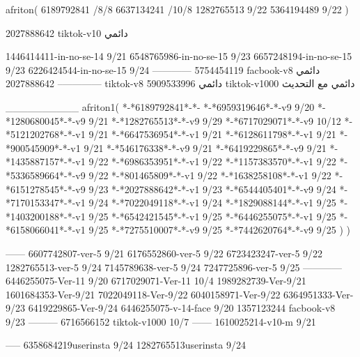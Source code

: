 afriton(
6189792841 /8/8
6637134241 /10/8
1282765513 9/22
5364194489 9/22
)

2027888642 tiktok-v10
دائمي



1446414411-in-no-se-14 9/21
6548765986-in-no-se-15 9/23
6657248194-in-no-se-15 9/23
6226424544-in-no-se-15 9/24
------------
5754454119 facbook-v8
دائمي
--------------
2027888642 tiktok-v8
دائمي
5909533996 tiktok-v1000
دائمي مع التحديث

__________
afriton1(
*-*6189792841*-*-
*-*6959319646*-*-v9 9/20
*-*1280680045*-*-v9 9/21
*-*1282765513*-*-v9 9/29
*-*6717029071*-*-v9 10/12
*-*5121202768*-*-v1 9/21
*-*6647536954*-*-v1 9/21
*-*6128611798*-*-v1 9/21
*-*900545909*-*-v1 9/21
*-*546176338*-*-v9 9/21
*-*6419229865*-*-v9 9/21
*-*1435887157*-*-v1 9/22
*-*6986353951*-*-v1 9/22
*-*1157383570*-*-v1 9/22
*-*5336589664*-*-v9 9/22
*-*801465809*-*-v1 9/22
*-*1638258108*-*-v1 9/22
*-*6151278545*-*-v9 9/23
*-*2027888642*-*-v1 9/23
*-*6544405401*-*-v9 9/24
*-*7170153347*-*-v1 9/24
*-*7022049118*-*-v1 9/24
*-*1829088144*-*-v1 9/25
*-*1403200188*-*-v1 9/25
*-*6542421545*-*-v1 9/25
*-*6446255075*-*-v1 9/25
*-*6158066041*-*-v1 9/25
*-*7275510007*-*-v9 9/25
*-*7442620764*-*-v9 9/25
)
)

------
6607742807-ver-5 9/21
6176552860-ver-5 9/22
6723423247-ver-5 9/22
1282765513-ver-5 9/24
7145789638-ver-5 9/24
7247725896-ver-5 9/25
------------
6446255075-Ver-11
9/20
6717029071-Ver-11
10/4
1989282739-Ver-9/21
1601684353-Ver-9/21
7022049118-Ver-9/22
6040158971-Ver-9/22
6364951333-Ver-9/23
6419229865-Ver-9/24
6446255075-v-14-face 9/20
1357123244 facbook-v8 9/23
---------
6716566152 tiktok-v1000
10/7
------
1610025214-v10-m 9/21

-----
6358684219userinsta 9/24
1282765513userinsta 9/24
